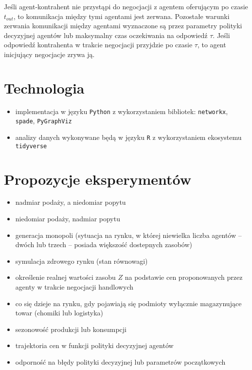 \documentclass[]{article}
\providecommand{\tightlist}{%
  \setlength{\itemsep}{0pt}\setlength{\parskip}{0pt}}
\begin{document}
Jeśli agent-kontrahent nie przystąpi do negocjacji z agentem oferującym
po czasie \(t_{out}\), to komunikacja między tymi agentami jest zerwana.
Pozostałe warunki zerwania komunikacji między agentami wyznaczone są
przez parametry polityki decyzyjnej agentów lub maksymalny czas
oczekiwania na odpowiedź \(\tau\). Jeśli odpowiedź kontrahenta w trakcie
negocjacji przyjdzie po czasie \(\tau\), to agent inicjujący negocjacje
zrywa ją.

\hypertarget{technologia}{%
\section{Technologia}\label{technologia}}

\begin{itemize}
\tightlist
\item
  implementacja w języku \texttt{Python} z wykorzystaniem bibliotek:
  \texttt{networkx}, \texttt{spade}, \texttt{PyGraphViz}
\item
  analizy danych wykonywane będą w języku \texttt{R} z wykorzystaniem
  ekosystemu \texttt{tidyverse}
\end{itemize}

\hypertarget{propozycje-eksperymentuxf3w}{%
\section{Propozycje eksperymentów}\label{propozycje-eksperymentuxf3w}}

\begin{itemize}
\tightlist
\item
  nadmiar podaży, a niedomiar popytu
\item
  niedomiar podaży, nadmiar popytu
\item
  generacja monopoli (sytuacja na rynku, w której niewielka liczba
  agentów -- dwóch lub trzech -- posiada większość dostepnych zasobów)
\item
  symulacja zdrowego rynku (stan równowagi)
\item
  określenie realnej wartości zasobu \(Z\) na podstawie cen
  proponowanych przez agenty w trakcie negocjacji handlowych
\item
  co się dzieje na rynku, gdy pojawiają się podmioty wyłącznie
  magazynujące towar (chomiki lub logistyka)
\item
  sezonowość produkcji lub konsumpcji
\item
  trajektoria cen w funkcji polityki decyzyjnej agentów
\item
  odporność na błędy polityki decyzyjnej lub parametrów początkowych
\end{itemize}
\end{document}
